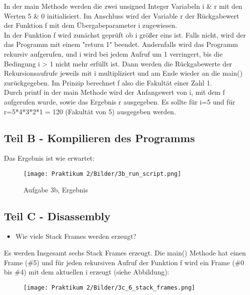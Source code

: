 \documentclass[12pt]{article}
\begin{document}
In der main Methode werden die zwei unsigned Integer Variabeln i \& r mit den Werten 5 \& 0 initialisiert. Im Anschluss wird der Variable r der Rückgabewert der Funktion f mit dem Übergabeparameter i zugewiesen.\\
In der Funktion f wird zunächst geprüft ob i größer eins ist. Falls nicht, wird der das Programm mit einem "return 1" beendet. Andernfalls wird das Programm rekursiv aufgerufen, und i wird bei jedem Aufruf um 1 verringert, bis die Bedingung i > 1 nicht mehr erfüllt ist. Dann werden die Rückgabewerte der Rekursionsaufrufe jeweils mit i multipliziert und am Ende wieder an die main() zurückgegeben. Im Prinzip berechnet f also die Fakultät einer Zahl 1.\\
Durch printf in der main Methode wird der Anfangswert von i, mit dem f aufgerufen wurde, sowie das Ergebnis r ausgegeben.
Es sollte für i=5 und für r=5*4*3*2*1 = 120 (Fakultät von 5) ausgegeben werden.
\newpage


\subsection{Teil B - Kompilieren des Programms}

Das Ergebnis ist wie erwartet:

\begin{figure}[htbp]
    \centering
    \texttt{[image: Praktikum 2/Bilder/3b\_run\_script.png]}
    \caption{Aufgabe 3b, Ergebnis}
\end{figure}

\subsection{Teil C - Disassembly}

\begin{itemize}
  \item Wie viele Stack Frames werden erzeugt?
\end{itemize}

Es werden Insgesamt sechs Stack Frames erzeugt. Die main() Methode hat einen Frame (\#5) und für jeden rekursiven Aufruf der Funktion f wird ein Frame (\#0 bis \#4) mit dem aktuellen i erzeugt (siehe Abbildung):

\begin{figure}[htbp]
    \centering
    \texttt{[image: Praktikum 2/Bilder/3c\_6\_stack\_frames.png]}
\end{figure}

\newpage
\end{document}
